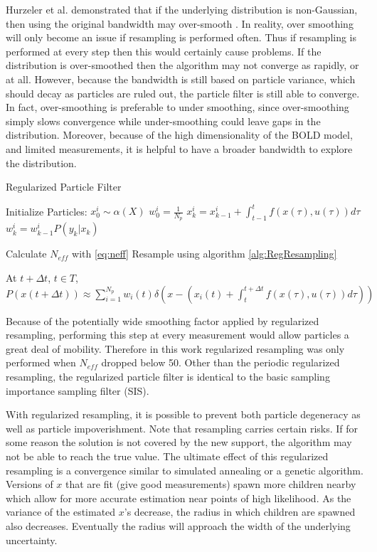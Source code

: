 Hurzeler et al. demonstrated that if the underlying 
distribution is non-Gaussian, then using the original bandwidth may over-smooth
\cite{Hurzeler1998}.  In reality, over smoothing
will only become an issue if resampling is performed often. Thus
if resampling is performed at every step then this would certainly cause problems.
If the distribution is over-smoothed then the algorithm may not converge as rapidly,
or at all. However, because the bandwidth is still based on particle variance, 
which should decay as particles are ruled out, the particle filter is still able to converge. 
In fact, over-smoothing is preferable
to under smoothing, since over-smoothing simply slows convergence while 
under-smoothing could leave gaps in the distribution.
Moreover, because of the high dimensionality of the \ac{BOLD} model,
and limited measurements, it is helpful to have a broader bandwidth to explore the distribution. 

\begin{algorithm}
\caption{Regularized Particle Filter}
\begin{algorithmic}
\STATE Initialize Particles:
    \STATE $x^i_0  \sim \alpha(X)$
    \STATE $w^i_0 = \frac{1}{N_p}$
\ENDFOR
{}
        \STATE $x^i_k = x^i_{k-1} + \int_{t-1}^t f(x(\tau), u(\tau)) d\tau $
        \STATE $w^i_k = w^i_{k-1}P(y_k | x_k)$
    \ENDFOR

    \STATE Calculate $N_{eff}$ with \autoref{eq:neff}
        \STATE Resample using algorithm \autoref{alg:RegResampling}
    \ENDIF
\ENDFOR

\STATE At $t + \Delta t$, $t \in T$, $P(x(t+\Delta t)) \approx 
\sum_{i=1}^{N_p} w_i(t)\delta\left(x - (x_i(t) + \int_t^{t+\Delta t} f(x(\tau), u(\tau)) d\tau) \right)$
 \end{algorithmic}
 \label{alg:RegularizedParticleFilter}
 \end{algorithm}

Because 
of the potentially wide smoothing factor applied by regularized resampling, performing this
step at every measurement would allow particles a great deal of mobility. Therefore
in this work regularized resampling was only performed when $N_{eff}$ dropped
below 50. Other than the periodic regularized
resampling, the regularized particle filter is identical to the basic sampling
importance sampling filter (SIS). 

With regularized resampling, it is possible to prevent both
particle degeneracy as well as particle impoverishment. 
Note that resampling carries certain risks.  
If for some reason the solution is not covered by the 
new support, the algorithm may not be able to reach the true value. 
The ultimate effect of this regularized resampling is a convergence 
similar to simulated annealing or a genetic algorithm. 
Versions of $x$ that are fit (give good measurements) spawn more children 
nearby which allow for more accurate estimation near points of high likelihood. 
As the variance of the estimated $x$'s decrease, the radius in 
which children are spawned also decreases. Eventually the radius
will approach the width of the underlying uncertainty.

